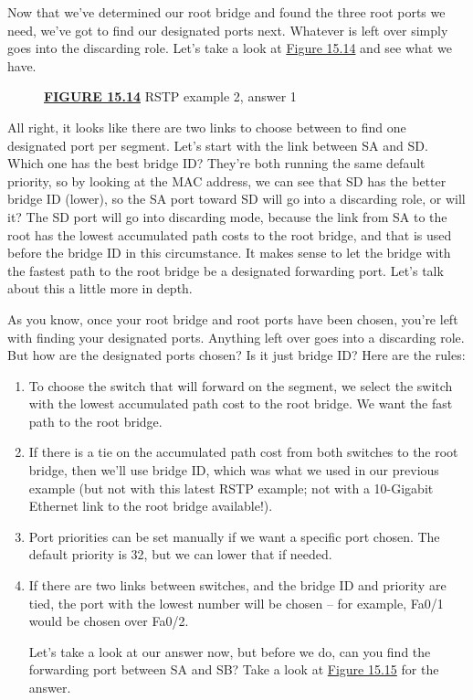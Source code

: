 Now that we've determined our root bridge and found the three root ports
we need, we've got to find our designated ports next. Whatever is left
over simply goes into the discarding role. Let's take a look at
\protect\hyperlink{c15.xhtmlux5cux23figure15-14}{Figure 15.14} and see
what we have.

\begin{figure}
\centering
\caption{{\protect\hyperlink{c15.xhtmlux5cux23figureanchor15-14}{\textbf{FIGURE
15.14}} RSTP example 2, answer 1}}
\end{figure}

All right, it looks like there are two links to choose between to find
one designated port per segment. Let's start with the link between SA
and SD. Which one has the best bridge
ID? They're both
running the same default priority, so by looking at the MAC address, we
can see that SD has the better bridge ID (lower), so the SA port toward
SD will go into a discarding role, or will it? The SD port will go into
discarding mode, because the link from SA to the root has the lowest
accumulated path costs to the root bridge, and that is used before the
bridge ID in this circumstance. It makes sense to let the bridge with
the fastest path to the root bridge be a designated forwarding port.
Let's talk about this a little more in depth.

As you know, once your root bridge and root ports have been chosen,
you're left with finding your designated ports. Anything left over goes
into a discarding role. But how are the designated ports chosen? Is it
just bridge ID? Here are the rules:

\begin{enumerate}
\item
  To choose the switch that will forward on the segment, we select the
  switch with the lowest accumulated path cost to the root bridge. We
  want the fast path to the root bridge.
\item
  If there is a tie on the accumulated path cost from both switches to
  the root bridge, then we'll use bridge ID, which was what we used in
  our previous example (but not with this latest RSTP example; not with
  a 10-Gigabit Ethernet link to the root bridge available!).
\item
  Port priorities can be set manually if we want a specific port chosen.
  The default priority is 32, but we can lower that if needed.
\item
  If there are two links between switches, and the bridge ID and
  priority are tied, the port with the lowest number will be
  chosen -- for example, Fa0/1 would be chosen over Fa0/2.

  Let's take a look at our answer now, but before we do, can you find
  the forwarding port between SA and SB? Take a look at
  \protect\hyperlink{c15.xhtmlux5cux23figure15-15}{Figure 15.15} for the
  answer.
\end{enumerate}

